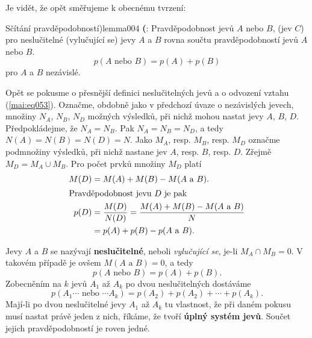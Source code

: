       
      
      Je vidět, že opět směřujeme k obecnému tvrzení:
      \begin{mathlemma}{Sčítání pravděpodobností)}{lemma004}
        \textbf{(}: Pravděpodobnost jevů \(A\) nebo \(B\),
        (jev \(C\)) pro neslučitelné (vylučující se) jevy \(A\) a \(B\) rovna součtu
        pravděpodobností jevů \(A\) nebo \(B\).
        \begin{equation}\label{mai:eq053}
          p(A \text{ nebo } B)= p(A) + p(B)
        \end{equation}
        pro \(A\) a \(B\) nezávislé.
      \end{mathlemma}
      
      Opět se pokusme o přesnější definici neslučitelných jevů a o odvození vztahu
      (\ref{mai:eq053}). Označme, obdobně jako v předchozí úvaze o nezávislých jevech, množiny
      \(N_A\), \(N_B\), \(N_D\) možných výsledků, při nichž mohou nastat jevy \(A\), \(B\), \(D\).
      Předpokládejme, že \(N_A = N_B\). Pak \(N_A = N_B = N_D\), a tedy \(N(A) = N(B) = N(D) = N\).
      Jako \(M_A\), resp. \(M_B\), resp. \(M_D\) označme podmnožiny výsledků, při nichž nastane jev
      \(A\), resp. \(B\), resp. \(D\). Zřejmě \(M_D = M_A \cup M_B\). Pro počet prvků množiny
      \(M_D\) platí 
      \begin{align*}
        M(D) &= M(A) + M(B) - M(A\text{ a }B).                                    \\
        \shortintertext{Pravděpodobnost jevu \(D\) je pak}
        p(D) &= \dfrac{M(D)}{N(D)} = \dfrac{M(A) + M(B) - M(A\text{ a }B)}{N}     \\
             &= p(A) + p(B) - p(A\text{ a }B).
      \end{align*}
      
      Jevy \(A\) a \(B\) se nazývají \textbf{neslučitelné}, neboli \emph{vylučující se}, je-li 
      \(M_A \cap M_B = 0\). V takovém případě je ovšem \(M(A\text{ a }B) = 0\), a tedy
      \begin{equation*}
        p(A\text{ nebo }B) = p(A) + p(B).
      \end{equation*}
      Zobecněním na \(k\) jevů \(A_1\) až \(A_k\) po dvou neslučitelných dostáváme
      \begin{equation*}
        p(A_1\cdots\text{ nebo }\cdots A_k) = p(A_2) + p(A_2) + \cdots + p(A_k).
      \end{equation*}
      Mají-li po dvou neslučitelné jevy \(A_1\) až \(A_k\) tu vlastnost, že při daném pokusu musí 
      nastat právě jeden z nich, říkáme, že tvoří \textbf{úplný systém jevů}. Součet jejich 
      pravděpodobností je roven jedné.
      
